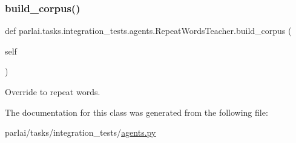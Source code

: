 \subsubsection{\texorpdfstring{build\+\_\+corpus()}{build\_corpus()}}
{\footnotesize\ttfamily def parlai.\+tasks.\+integration\+\_\+tests.\+agents.\+Repeat\+Words\+Teacher.\+build\+\_\+corpus (\begin{DoxyParamCaption}\item[{}]{self }\end{DoxyParamCaption})}

\begin{DoxyVerb}Override to repeat words.
\end{DoxyVerb}
 

The documentation for this class was generated from the following file\+:\begin{DoxyCompactItemize}
\item 
parlai/tasks/integration\+\_\+tests/\hyperlink{parlai_2tasks_2integration__tests_2agents_8py}{agents.\+py}\end{DoxyCompactItemize}
